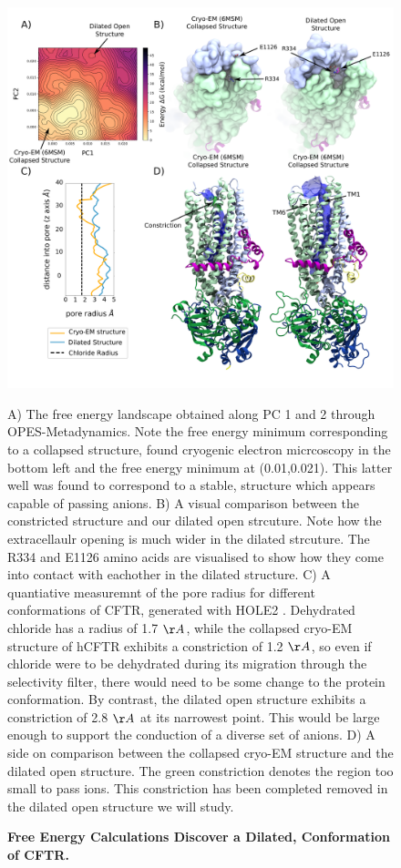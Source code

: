 \begin{figure}
	\begin{center}
		\includegraphics[width=1\textwidth]{figures/opening/summary_dilated_structure_1.pdf}
	\end{center}
	\captionsetup{singlelinecheck = false, justification=raggedright}
	\caption[Free Energy Calculations Discover a Dilated, Conformation of CFTR.] {\textbf{Free Energy Calculations Discover a Dilated, Conformation of CFTR.}}{A) The free energy landscape obtained along PC 1 and 2 through OPES-Metadynamics. Note the free energy minimum corresponding to a collapsed structure, found cryogenic electron micrcoscopy in the bottom left and the free energy minimum at (0.01,0.021). This latter well was found to correspond to a stable, structure which appears capable of passing anions. B) A visual comparison between the constricted structure and our dilated open strcuture. Note how the extracellaulr opening is much wider in the dilated strcuture. The R334 and E1126 amino acids are visualised to show how they come into contact with eachother in the dilated structure. C) A quantiative measuremnt of the pore radius for different conformations of CFTR, generated with HOLE2 \cite{smart1996}. Dehydrated chloride has a radius of 1.7 $\AA$, while the collapsed cryo-EM structure of hCFTR exhibits a constriction of 1.2 $\AA$, so even if chloride were to be dehydrated during its migration through the selectivity filter, there would need to be some change to the protein conformation. By contrast, the dilated open structure exhibits a constriction of 2.8 $\AA$ at its  narrowest point. This would be large enough to support the conduction of a diverse set of anions.  D) A side on comparison between the collapsed cryo-EM structure and the dilated open structure. The green constriction denotes the region too small to pass ions. This constriction has been completed removed in the dilated open structure we will study. }
	\label{summary_FES}
\end{figure}


